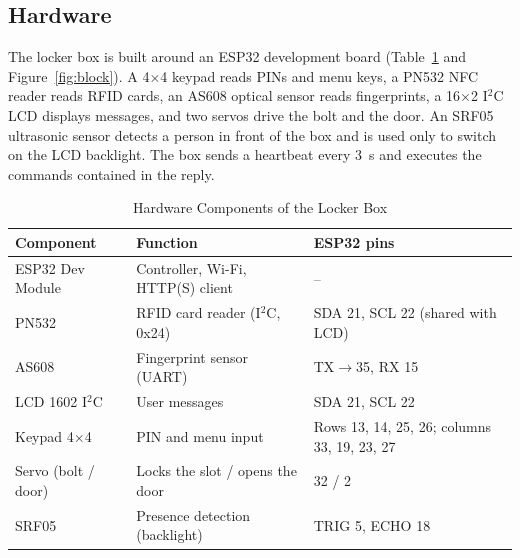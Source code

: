 \subsection{Hardware}

The locker box is built around an ESP32 development board (Table~\ref{tab:hw} and Figure~\ref{fig:block}). A 4$\times$4
keypad reads PINs and menu keys, a PN532 NFC reader reads RFID cards, an AS608 optical sensor reads fingerprints, a
16$\times$2 I$^2$C LCD displays messages, and two servos drive the bolt and the door. An SRF05 ultrasonic sensor
detects a person in front of the box and is used only to switch on the LCD backlight. The box sends a heartbeat every
3~s and executes the commands contained in the reply.

\begin{table}[t]
\renewcommand{\arraystretch}{1.1}
\centering
\small
\caption{Hardware Components of the Locker Box}
\label{tab:hw}
\begin{tabular}{l l l}
\toprule
Component & Function & ESP32 pins \\
\midrule
ESP32 Dev Module & Controller, Wi-Fi, HTTP(S) client & -- \\
PN532 & RFID card reader (I$^2$C, 0x24) & SDA 21, SCL 22 (shared with LCD) \\
AS608 & Fingerprint sensor (UART) & TX$\rightarrow$35, RX 15 \\
LCD 1602 I$^2$C & User messages & SDA 21, SCL 22 \\
Keypad 4$\times$4 & PIN and menu input & Rows 13, 14, 25, 26; columns 33, 19, 23, 27 \\
Servo (bolt / door) & Locks the slot / opens the door & 32 / 2 \\
SRF05 & Presence detection (backlight) & TRIG 5, ECHO 18 \\
\bottomrule
\end{tabular}
\end{table}

